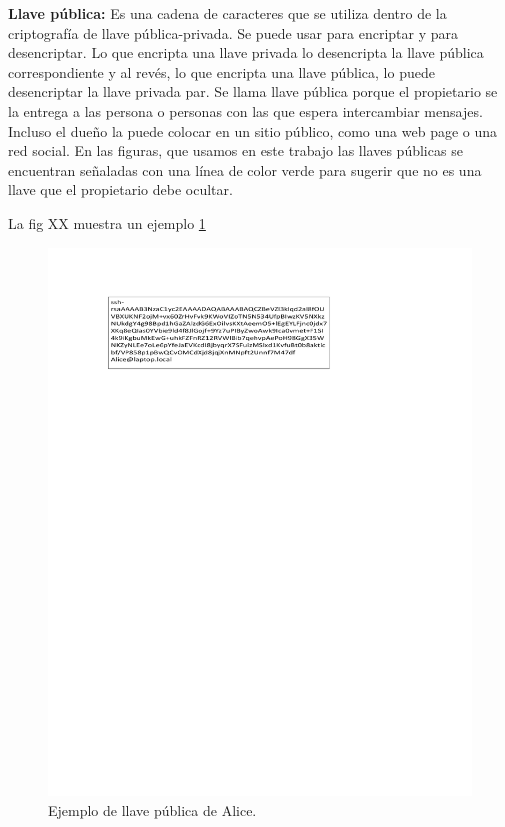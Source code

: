 \documentclass[12pt]{report} %
\begin{document}
\begin{itemize}
\textbf{Llave pública:} Es una cadena de caracteres que se utiliza dentro de la criptografía de llave pública-privada. Se puede usar para encriptar y para desencriptar.  Lo que encripta una llave privada lo desencripta la llave pública correspondiente y al revés, lo que encripta una llave pública, lo puede desencriptar la llave privada par.  Se llama llave pública porque el propietario se la entrega a las persona o personas con las que espera intercambiar mensajes. Incluso el dueño la puede colocar en un sitio público, como una web page o una red social. En las figuras, que usamos en este trabajo las llaves públicas se encuentran señaladas con una línea de color verde para sugerir que no es una llave que el propietario debe ocultar.

La fig XX muestra un ejemplo \ref{Fig. llavepublica}

\begin{figure}
\centering
\includegraphics[width=0.85\columnwidth]{imagenes/figllavepublica.pdf}
\caption{Ejemplo de llave pública de Alice.}
\label{Fig. llavepublica}
\end{figure} 


\end{itemize}
\end{document}
